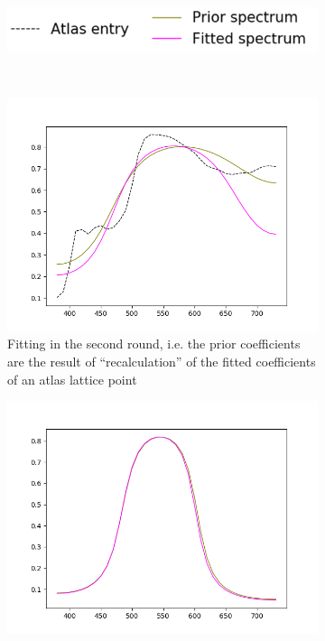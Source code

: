\begin{figure}[t]
	\centering
	\begin{subfigure}[t]{0.4\textwidth}
		\includegraphics[width=\linewidth]{img/cost_functions_regular_legend.png}
	\end{subfigure} \\
	\begin{subfigure}[t]{0.45\textwidth}
	\includegraphics[width=\linewidth]{img/cost_functions_regular_round2.png}
	\caption{Fitting in the second round, i.e. the prior coefficients are the result of ``recalculation'' of the fitted coefficients of an atlas lattice point}
	\label{fig:costFunctionsRegularRound2}
	\end{subfigure} \hspace{0.1em}
	\begin{subfigure}[t]{0.45\textwidth}
		\includegraphics[width=\linewidth,height=0.2\textheight]{img/cost_functions_regular_round8.png}

\end{subfigure}
\end{figure}
